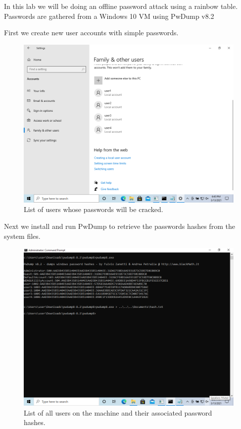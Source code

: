 In this lab we will be doing an offline password attack using a rainbow table.
Passwords are gathered from a Windows 10 VM using PwDump v8.2

First we create new user accounts with simple passwords.
\begin{figure}[H]
    \centering
    \includegraphics[width=\linewidth]{figures/1-users.png}
    \caption{List of users whose passwords will be cracked.}
\end{figure}

Next we install and run PwDump to retrieve the passwords hashes from the system files.
\begin{figure}[H]
    \centering
    \includegraphics[width=\linewidth]{figures/2-pwdump.png}
    \caption{List of all users on the machine and their associated password hashes.}
\end{figure}

